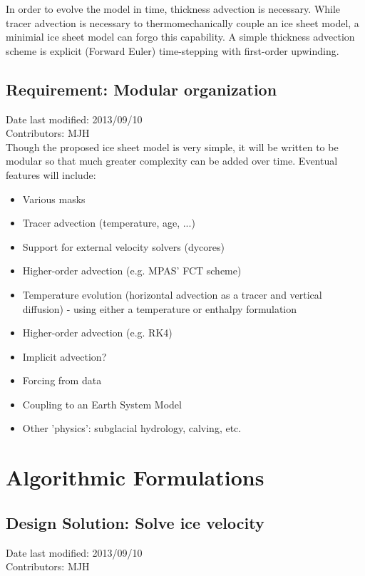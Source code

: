 \documentclass[11pt]{report}
\begin{document}
In order to evolve the model in time, thickness advection is necessary.  While tracer advection is necessary to thermomechanically couple an ice sheet model, a minimial ice sheet model can forgo this capability.  A simple thickness advection scheme is explicit (Forward Euler) time-stepping with first-order upwinding.


\section{Requirement: Modular organization}
Date last modified: 2013/09/10 \\
Contributors: MJH \\

Though the proposed ice sheet model is very simple, it will be written to be modular so that much greater complexity can be added over time.  Eventual features will include:

\begin{itemize}
\item Various masks
\item Tracer advection (temperature, age, ...)
\item Support for external velocity solvers (dycores)
\item Higher-order advection (e.g. MPAS' FCT scheme)
\item Temperature evolution (horizontal advection as a tracer and vertical diffusion) - using either a temperature or enthalpy formulation
\item Higher-order advection (e.g. RK4)
\item Implicit advection?
\item Forcing from data
\item Coupling to an Earth System Model
\item Other 'physics': subglacial hydrology, calving, etc.
\end{itemize}



\chapter{Algorithmic Formulations}

\section{Design Solution: Solve ice velocity}
Date last modified: 2013/09/10 \\
Contributors: MJH \\
\end{document}
